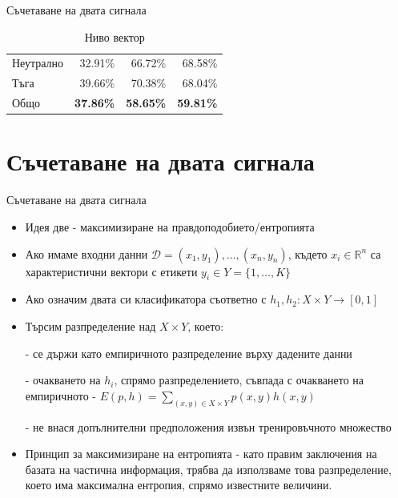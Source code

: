 \documentclass[9pt]{beamer}
\begin{document}
\begin{frame}[t]{Съчетаване на двата сигнала}
\begin{table}[h]
\begin{center}
{\begin{tabular}{|l|r r r|}
                    Неутрално & 32.91\%           & 66.72\%          & 68.58\%          \\
                    Тъга      & 39.66\%          & 70.38\%          & 68.04\%          \\
                    \hline
                    \hline
                    Общо      & \textbf{37.86\%} & \textbf{58.65\%} & \textbf{59.81\%} \\
                    \hline
                \end{tabular}}
                \caption*{Ниво вектор}
            \end{center}
        \end{table}
    \end{frame}

    \section{Съчетаване на двата сигнала}
    \begin{frame}[t]{Съчетаване на двата сигнала}
        \begin{itemize}
            \setlength\itemsep{\fill}
            \pause
            \item Идея две
            \pause - максимизиране на правдоподобието/ентропията
            \pause
            \item Ако имаме входни данни $\mathcal{D} = (x_1, y_1),\ldots,(x_n, y_n)$, където $x_i \in \mathbb{R}^n$ са характеристични вектори с етикети $y_i \in Y=\{1,\ldots, K\}$
            \pause
            \item Ако означим двата си класификатора съответно с $h_1, h_2: X\times Y \rightarrow [0, 1]$
            \pause
            \item Търсим разпределение над $X\times Y$, което:
            
            \pause - се държи като емпиричното разпределение върху дадените данни
            
            \pause - очакването на $h_i$, спрямо разпределението, съвпада с очакването на емпиричното
            \pause - $E(p, h) = \sum\limits_{(x, y) \in X\times Y} p(x, y)h(x, y)$

            \pause - не внася допълнителни предположения извън тренировъчното множество
            \pause
            \item Принцип за максимизиране на ентропията
            \pause - като правим заключения на базата на частична информация, трябва да използваме това разпределение, което има максимална ентропия, спрямо известните величини.
        \end{itemize}
    \end{frame}
\end{document}
